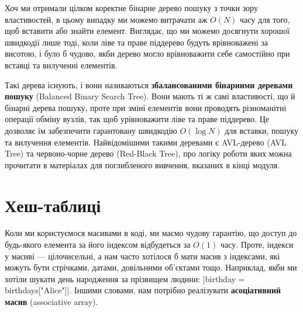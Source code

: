\documentclass[12pt,a4paper]{report}
\begin{document}
Хоч ми отримали цілком коректне бінарне дерево пошуку з точки зору властивостей, в цьому випадку ми можемо витрачати аж \(O(N)\) часу для того, щоб вставити або знайти елемент. Виглядає, що ми можемо досягнути хорошої швидкодії лише тоді, коли ліве та праве піддерево будуть врівноважені за висотою, і було б чудово, якби дерево могло врівноважити себе самостійно при вставці та вилученні елементів.

\begin{center}
\end{center}

Такі дерева існують, і вони називаються \textbf{збалансованими бінарними деревами пошуку} (Balanced Binary Search Tree). Вони мають ті ж самі властивості, що й бінарні дерева пошуку, проте при зміні елементів вони проводять різноманітні операції обміну вузлів, так щоб урівноважити ліве та праве піддерево. Це дозволяє їм забезпечити гарантовану швидкодію \(O(\log N)\) для вставки, пошуку та вилучення елементів. Найвідомішими такими деревами є AVL-дерево (AVL Tree) та червоно-чорне дерево (Red-Black Tree), про логіку роботи яких можна прочитати в матеріалах для поглибленого вивчення, вказаних в кінці модуля.



\section{Хеш-таблиці}

Коли ми користуємося масивами в коді, ми маємо чудову гарантію, що доступ до будь-якого елемента за його індексом відбудеться за \(O(1)\) часу. Проте, індекси у масиві --- цілочисельні, а нам часто хотілося б мати масив з індексами, які можуть бути стрічками, датами, довільними об’єктами тощо. Наприклад, якби ми хотіли шукати день народження за прізвищем людини: |birthday = birthdays["Alice"]|. Іншими словами, нам потрібно реалізувати \textbf{асоціативний масив} (associative array).
\end{document}

